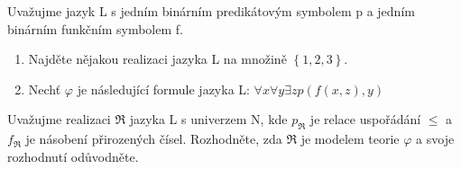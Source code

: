 Uvažujme jazyk L s jedním binárním predikátovým symbolem p a jedním binárním
funkčním symbolem f.

\begin{enumerate}
  \item Najděte nějakou realizaci jazyka L na množině $\left \{ 1,2,3 \right
  \}$.
  \item Nechť $\varphi$ je následující formule jazyka L: $\forall x \forall y
  \exists z p(f(x,z),y)$
\end{enumerate}

Uvažujme realizaci $\Re$ jazyka L s univerzem N, kde $p_{\Re}$ je relace
uspořádání $\leq$ a $f_{\Re}$ je násobení přirozených čísel. Rozhodněte, zda
$\Re$ je modelem teorie $\varphi$ a svoje rozhodnutí odůvodněte.

